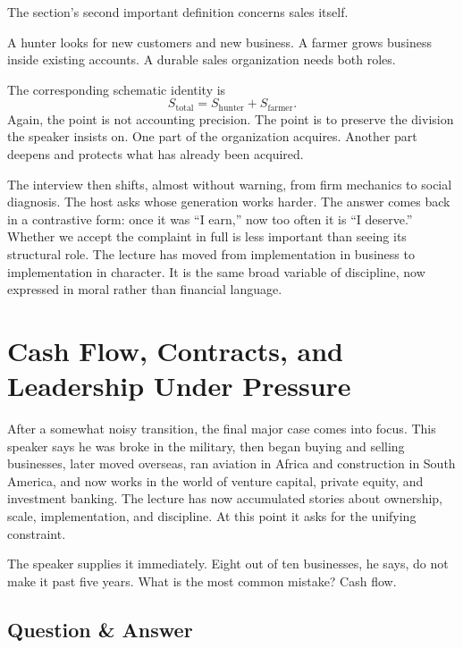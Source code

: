 The section's second important definition concerns sales itself.

\begin{definition}
A hunter looks for new customers and new business. A farmer grows business inside existing accounts. A durable sales organization needs both roles.
\end{definition}

The corresponding schematic identity is
\begin{equation}
S_{\text{total}} = S_{\text{hunter}} + S_{\text{farmer}}.
\end{equation}
Again, the point is not accounting precision. The point is to preserve the division the speaker insists on. One part of the organization acquires. Another part deepens and protects what has already been acquired.

The interview then shifts, almost without warning, from firm mechanics to social diagnosis. The host asks whose generation works harder. The answer comes back in a contrastive form: once it was ``I earn,'' now too often it is ``I deserve.'' Whether we accept the complaint in full is less important than seeing its structural role. The lecture has moved from implementation in business to implementation in character. It is the same broad variable of discipline, now expressed in moral rather than financial language.

\section{Cash Flow, Contracts, and Leadership Under Pressure}

After a somewhat noisy transition, the final major case comes into focus. This speaker says he was broke in the military, then began buying and selling businesses, later moved overseas, ran aviation in Africa and construction in South America, and now works in the world of venture capital, private equity, and investment banking. The lecture has now accumulated stories about ownership, scale, implementation, and discipline. At this point it asks for the unifying constraint.

The speaker supplies it immediately. Eight out of ten businesses, he says, do not make it past five years. What is the most common mistake? Cash flow.

\subsection{Question \& Answer}

